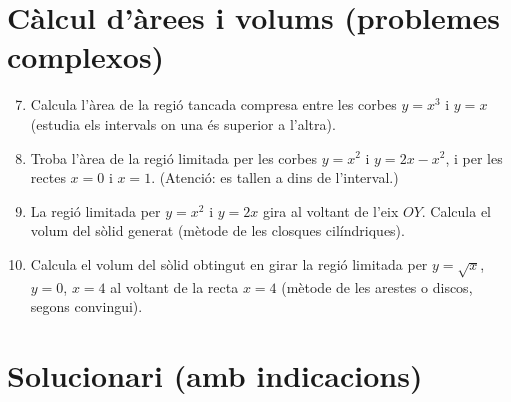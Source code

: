 \documentclass[12pt]{article}
\begin{document}
\section*{Càlcul d'àrees i volums (problemes complexos)}

\begin{enumerate}[label=\arabic*.]
    \setcounter{enumi}{6}
    \item Calcula l'àrea de la regió tancada compresa entre les corbes $y=x^3$ i $y=x$ (estudia els intervals on una és superior a l'altra).

    \item Troba l'àrea de la regió limitada per les corbes $y = x^2$ i $y = 2x - x^2$, i per les rectes $x=0$ i $x=1$. (Atenció: es tallen a dins de l'interval.)

    \item La regió limitada per $y = x^2$ i $y = 2x$ gira al voltant de l'eix $OY$. Calcula el volum del sòlid generat (mètode de les closques cilíndriques).

    \item Calcula el volum del sòlid obtingut en girar la regió limitada per $y = \sqrt{x}$, $y = 0$, $x=4$ al voltant de la recta $x=4$ (mètode de les arestes o discos, segons convingui).
\end{enumerate}

\newpage

\section*{Solucionari (amb indicacions)}
\end{document}
